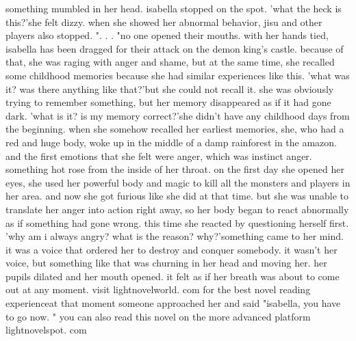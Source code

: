 something mumbled in her head.
 isabella stopped on the spot.
'what the heck is this?'she felt dizzy.
 when she showed her abnormal behavior, jisu and other players also stopped.
".
.
.
"no one opened their mouths.
with her hands tied, isabella has been dragged for their attack on the demon king's castle.
because of that, she was raging with anger and shame, but at the same time, she recalled some childhood memories because she had similar experiences like this.
'what was it? was there anything like that?'but she could not recall it.
 she was obviously trying to remember something, but her memory disappeared as if it had gone dark.
'what is it? is my memory correct?'she didn't have any childhood days from the beginning.
 when she somehow recalled her earliest memories, she, who had a red and huge body, woke up in the middle of a damp rainforest in the amazon.
 and the first emotions that she felt were anger, which was instinct anger.
 something hot rose from the inside of her throat.
on the first day she opened her eyes, she used her powerful body and magic to kill all the monsters and players in her area.
and now she got furious like she did at that time.
but she was unable to translate her anger into action right away, so her body began to react abnormally as if something had gone wrong.
this time she reacted by questioning herself first.
'why am i always angry? what is the reason? why?'something came to her mind.
 it was a voice that ordered her to destroy and conquer somebody.
 it wasn't her voice, but something like that was churning in her head and moving her.
 her pupils dilated and her mouth opened.
 it felt as if her breath was about to come out at any moment.
visit lightnovelworld.
c‌om for the best novel reading experienceat that moment someone approached her and said "isabella, you have to go now.
" you can also read this novel on the more advanced platform lightnovelspot.
com

 